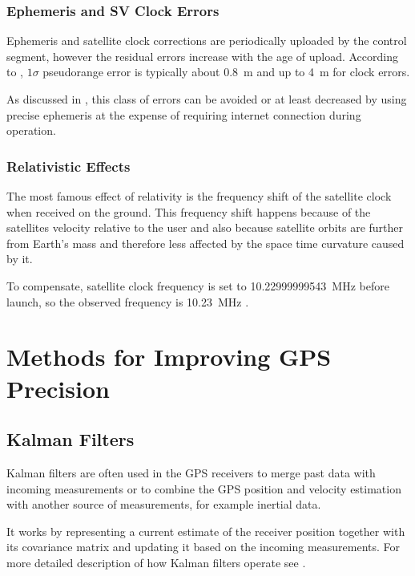 \subsubsection{Ephemeris and SV Clock Errors}

Ephemeris and satellite clock corrections are periodically uploaded by the control
segment, however the residual errors increase with the age of upload.
According to \cite{kaplan06}, \(1 \sigma\) pseudorange error is typically about \SI{0.8}{\meter}
and up to \SI{4}{\meter} for clock errors.

As discussed in , this class of errors can be avoided or at least decreased by using precise ephemeris
at the expense of requiring internet connection during operation.

\subsubsection{Relativistic Effects}

The most famous effect of relativity is the frequency shift of the satellite clock
when received on the ground.
This frequency shift happens because of the satellites velocity relative to the user
and also because satellite orbits are further from Earth's mass and therefore less
affected by the space time curvature caused by it.

To compensate, satellite clock frequency is set to
\SI{10.22999999543}{\mega\hertz} before launch, so the observed frequency
is \SI{10.23}{\mega\hertz} \cite{fyfe92}.

\section{Methods for Improving GPS Precision}

\subsection{Kalman Filters}
Kalman filters are often used in the GPS receivers to merge past
data with incoming measurements or to combine the GPS position and velocity
estimation with another source of measurements, for example inertial data.

It works by representing a current estimate of the receiver position together
with its covariance matrix and updating it based on the incoming measurements.
For more detailed description of how Kalman filters operate see .

